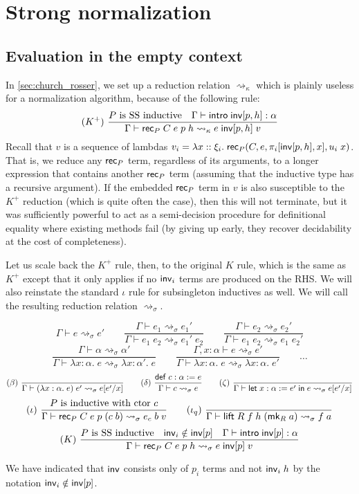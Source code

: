 \section{Strong normalization}
\subsection{Evaluation in the empty context}
In \autoref{sec:church_rosser}, we set up a reduction relation $\rightsquigarrow_\kappa$ which is plainly useless for a normalization algorithm, because of the following rule:
$$(K^+)\ \frac{P\mbox{ is SS inductive}\quad\Gamma\vdash \intro\;\inv[p,h]:\alpha}{\Gamma\vdash \rec_P\;C\;e\;p\;h\rightsquigarrow_\kappa e\;\inv[p,h]\;v}$$
Recall that $v$ is a sequence of lambdas $v_i=\lambda x::\xi_i.\;\mathsf{rec}_P(C,e,\pi_i[\mathsf{inv}[p,h],x],u_i\;x)$. That is, we reduce any $\mathsf{rec}_P$ term, regardless of its arguments, to a longer expression that contains another $\mathsf{rec}_P$ term (assuming that the inductive type has a recursive argument). If the embedded $\mathsf{rec}_P$ term in $v$ is also susceptible to the $K^+$ reduction (which is quite often the case), then this will not terminate, but it was sufficiently powerful to act as a semi-decision procedure for definitional equality where existing methods fail (by giving up early, they recover decidability at the cost of completeness).

Let us scale back the $K^+$ rule, then, to the original $K$ rule, which is the same as $K^+$ except that it only applies if no $\mathsf{inv}_i$ terms are produced on the RHS. We will also reinstate the standard $\iota$ rule for subsingleton inductives as well. We will call the resulting reduction relation $\rightsquigarrow_\sigma$.

$$\boxed{\Gamma\vdash e\rightsquigarrow_\sigma e'}\qquad
\frac{\Gamma\vdash e_1 \rightsquigarrow_\sigma e_1'}{\Gamma\vdash e_1\;e_2\rightsquigarrow_\sigma e_1'\;e_2}\qquad
\frac{\Gamma\vdash e_2 \rightsquigarrow_\sigma e_2'}{\Gamma\vdash e_1\;e_2\rightsquigarrow_\sigma e_1\;e_2'}$$
$$\frac{\Gamma\vdash \alpha \rightsquigarrow_\sigma\alpha'}{\Gamma\vdash \lambda x:\alpha.\;e\rightsquigarrow_\sigma \lambda x:\alpha'.\;e}\qquad
\frac{\Gamma,x:\alpha\vdash e \rightsquigarrow_\sigma e'}{\Gamma\vdash \lambda x:\alpha.\;e\rightsquigarrow_\sigma \lambda x:\alpha.\;e'}\qquad\dots$$
$$(\beta)\ \frac{}{\Gamma\vdash (\lambda x:\alpha.\;e)\;e'\rightsquigarrow_\sigma e[e'/x]}\qquad
(\delta)\ \frac{\mathsf{def}\;c:\alpha:=e}{\Gamma\vdash c\rightsquigarrow_\sigma e}\qquad
(\zeta)\ \frac{}{\Gamma\vdash \elet{x:\alpha:=e'}{e}\rightsquigarrow_\sigma e[e'/x]}$$
$$(\iota)\ \frac{P\mbox{ is inductive with ctor }c}{\Gamma\vdash \rec_P\;C\;e\;p\;(c\;b)\rightsquigarrow_\sigma e_c\;b\;v}\qquad
(\iota_q)\ \frac{}{\Gamma\vdash \lift\;R\;f\;h\;(\mk_R\;a)\rightsquigarrow_\sigma f\;a}$$
$$(K)\ \frac{P\mbox{ is SS inductive}\quad\inv_i\notin\inv[p]\quad\Gamma\vdash \intro\;\inv[p]:\alpha}{\Gamma\vdash \rec_P\;C\;e\;p\;h\rightsquigarrow_\sigma e\;\inv[p]\;v}$$

We have indicated that $\mathsf{inv}$ consists only of $p_i$ terms and not $\mathsf{inv}_i\;h$ by the notation $\mathsf{inv}_i\notin\mathsf{inv}[p]$.